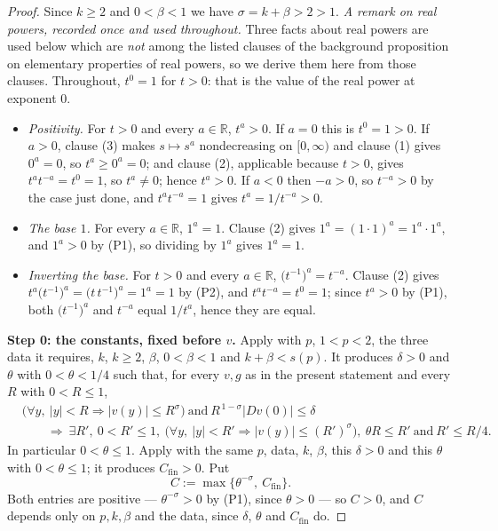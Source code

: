 \begin{proof}
Since $k\ge2$ and $0<\beta<1$ we have $\sigma=k+\beta>2>1$.
\medskip\noindent\emph{A remark on real powers, recorded once and used throughout.}  Three
facts about real powers are used below which are \emph{not} among the listed clauses of the
background proposition on elementary properties of real powers, so we derive them here from
those clauses.  Throughout, $t^{0}=1$ for $t>0$: that is the value of the real power at
exponent $0$.
\begin{itemize}
\item[(P1)] \emph{Positivity.}  For $t>0$ and every $a\in\mathbb{R}$, $t^{a}>0$.  If $a=0$ this
is $t^{0}=1>0$.  If $a>0$, clause (3) makes $s\mapsto s^{a}$ nondecreasing on $[0,\infty)$ and
clause (1) gives $0^{a}=0$, so $t^{a}\ge0^{a}=0$; and clause (2), applicable because $t>0$,
gives $t^{a}t^{-a}=t^{0}=1$, so $t^{a}\ne0$; hence $t^{a}>0$.  If $a<0$ then $-a>0$, so
$t^{-a}>0$ by the case just done, and $t^{a}t^{-a}=1$ gives $t^{a}=1/t^{-a}>0$.
\item[(P2)] \emph{The base $1$.}  For every $a\in\mathbb{R}$, $1^{a}=1$.  Clause (2) gives
$1^{a}=(1\cdot1)^{a}=1^{a}\cdot1^{a}$, and $1^{a}>0$ by (P1), so dividing by $1^{a}$ gives
$1^{a}=1$.
\item[(P3)] \emph{Inverting the base.}  For $t>0$ and every $a\in\mathbb{R}$,
$\bigl(t^{-1}\bigr)^{a}=t^{-a}$.  Clause (2) gives
$t^{a}\bigl(t^{-1}\bigr)^{a}=\bigl(t\,t^{-1}\bigr)^{a}=1^{a}=1$ by (P2), and
$t^{a}t^{-a}=t^{0}=1$; since $t^{a}>0$ by (P1), both $\bigl(t^{-1}\bigr)^{a}$ and $t^{-a}$
equal $1/t^{a}$, hence they are equal.
\end{itemize}


\medskip\noindent\textbf{Step 0: the constants, fixed before $v$.}
Apply  with $p$, $1<p<2$, the three data it requires, $k$, $k\ge2$,
$\beta$, $0<\beta<1$ and $k+\beta<s(p)$.  It produces $\delta>0$ and $\theta$ with
$0<\theta<1/4$ such that, for every $v,g$ as in the present statement and every $R$ with
$0<R\le1$,
\begin{equation}\label{eq:ap-step}
  \begin{aligned}
  &\bigl(\forall y,\ \lvert y\rvert<R\Rightarrow\lvert v(y)\rvert\le R^{\sigma}\bigr)
   \ \text{and}\ R^{\,1-\sigma}\lvert Dv(0)\rvert\le\delta\\
  &\qquad\Longrightarrow\ \exists R',\ 0<R'\le1,\
   \bigl(\forall y,\ \lvert y\rvert<R'\Rightarrow\lvert v(y)\rvert\le (R')^{\sigma}\bigr),\
   \theta R\le R'\ \text{and}\ R'\le R/4 .
  \end{aligned}
\end{equation}
In particular $0<\theta\le1$.  Apply  with the same $p$, data, $k$,
$\beta$, this $\delta>0$ and this $\theta$ with $0<\theta\le1$; it produces $C_{\mathrm{fin}}>0$.
Put
\[
  C:=\max\bigl\{\theta^{-\sigma},\ C_{\mathrm{fin}}\bigr\}.
\]
Both entries are positive --- $\theta^{-\sigma}>0$ by (P1), since $\theta>0$ --- so $C>0$, and
$C$ depends only on $p,k,\beta$ and
the data, since $\delta$, $\theta$ and $C_{\mathrm{fin}}$ do.


\end{proof}
